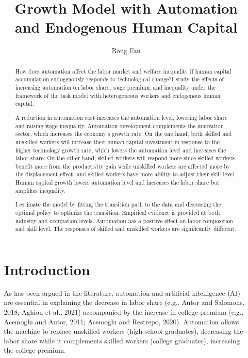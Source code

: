 \documentclass[12pt]{article}
\title{Growth Model with Automation and Endogenous Human Capital}
\date{}
\author{Rong Fan}
\begin{document}
\maketitle
\begin{abstract}
How does automation affect the labor market and welfare inequality if human capital accumulation endogenously responds to technological change?I study the effects of increasing automation on labor share, wage premium, and inequality under the framework of the task model with heterogeneous workers and endogenous human capital.

A reduction in automation cost increases the automation level, lowering labor share and raising wage inequality. Automation development complements the innovation sector, which increases the economy's growth rate. On the one hand, both skilled and unskilled workers will increase their human capital investment in response to the higher technology growth rate, which lowers the automation level and increases the labor share. On the other hand, skilled workers will respond more since skilled workers benefit more from the productivity gain while unskilled workers are affected more by the displacement effect, and skilled workers have more ability to adjust their skill level. Human capital growth lowers automation level and increases the labor share but amplifies inequality.

I estimate the model by fitting the transition path to the data and discussing the optimal policy to optimize the transition. Empirical evidence is provided at both industry and occupation levels. Automation has a positive effect on labor composition and skill level. The responses of skilled and unskilled workers are significantly different.

\end{abstract}

\clearpage
\section{Introduction}
As has been argued in the literature, automation and artificial intelligence (AI) are essential in explaining the decrease in labor share (e.g., Autor and Salomons, 2018\cite{AutorSalomons2018}; Aghion et al., 2021\cite{Aghionetal2021}) accompanied by the increase in college premium (e.g., Acemoglu and Autor, 2011\cite{AcemogluAutor2011}; Acemoglu and Restrepo, 2020\cite{AcemogluRestrepo2020}). Automation allows the machine to replace unskilled workers (high school graduates), decreasing the labor share while it complements skilled workers (college graduates), increasing the college premium.
\end{document}
